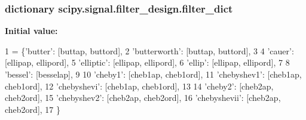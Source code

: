 \subsubsection[{filter\+\_\+dict}]{\setlength{\rightskip}{0pt plus 5cm}dictionary scipy.\+signal.\+filter\+\_\+design.\+filter\+\_\+dict}\label{namespacescipy_1_1signal_1_1filter__design_a23ab4b1c5a1e9c67731e24f1cfc8123b}
{\bfseries Initial value\+:}
\begin{DoxyCode}
1 = \{\textcolor{stringliteral}{'butter'}: [buttap, buttord],
2                \textcolor{stringliteral}{'butterworth'}: [buttap, buttord],
3 
4                \textcolor{stringliteral}{'cauer'}: [ellipap, ellipord],
5                \textcolor{stringliteral}{'elliptic'}: [ellipap, ellipord],
6                \textcolor{stringliteral}{'ellip'}: [ellipap, ellipord],
7 
8                \textcolor{stringliteral}{'bessel'}: [besselap],
9 
10                \textcolor{stringliteral}{'cheby1'}: [cheb1ap, cheb1ord],
11                \textcolor{stringliteral}{'chebyshev1'}: [cheb1ap, cheb1ord],
12                \textcolor{stringliteral}{'chebyshevi'}: [cheb1ap, cheb1ord],
13 
14                \textcolor{stringliteral}{'cheby2'}: [cheb2ap, cheb2ord],
15                \textcolor{stringliteral}{'chebyshev2'}: [cheb2ap, cheb2ord],
16                \textcolor{stringliteral}{'chebyshevii'}: [cheb2ap, cheb2ord],
17                \}
\end{DoxyCode}
